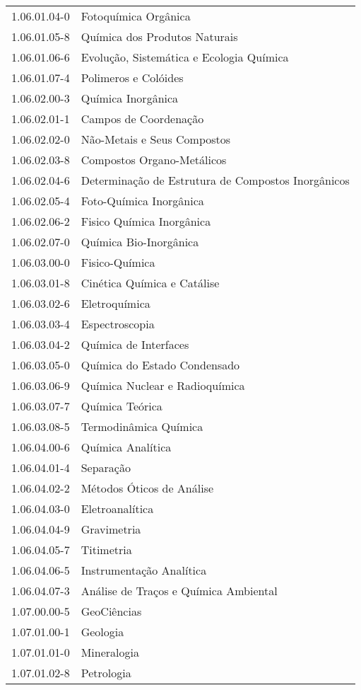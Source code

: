 \begin{longtable}[c]{p{2.15cm}p{13cm}}
1.06.01.04-0 & Fotoquímica Orgânica \\
1.06.01.05-8 & Química dos Produtos Naturais \\
1.06.01.06-6 & Evolução, Sistemática e Ecologia Química \\
1.06.01.07-4 & Polimeros e Colóides \\
1.06.02.00-3 & Química Inorgânica \\
1.06.02.01-1 & Campos de Coordenação \\
1.06.02.02-0 & Não-Metais e Seus Compostos \\
1.06.02.03-8 & Compostos Organo-Metálicos \\
1.06.02.04-6 & Determinação de Estrutura de Compostos Inorgânicos \\
1.06.02.05-4 & Foto-Química Inorgânica \\
1.06.02.06-2 & Fisico Química Inorgânica \\
1.06.02.07-0 & Química Bio-Inorgânica \\
1.06.03.00-0 & Fisico-Química \\
1.06.03.01-8 & Cinética Química e Catálise \\
1.06.03.02-6 & Eletroquímica \\
1.06.03.03-4 & Espectroscopia \\
1.06.03.04-2 & Química de Interfaces \\
1.06.03.05-0 & Química do Estado Condensado \\
1.06.03.06-9 & Química Nuclear e Radioquímica \\
1.06.03.07-7 & Química Teórica \\
1.06.03.08-5 & Termodinâmica Química \\
1.06.04.00-6 & Química Analítica \\
1.06.04.01-4 & Separação \\
1.06.04.02-2 & Métodos Óticos de Análise \\
1.06.04.03-0 & Eletroanalítica \\
1.06.04.04-9 & Gravimetria \\
1.06.04.05-7 & Titimetria \\
1.06.04.06-5 & Instrumentação Analítica \\
1.06.04.07-3 & Análise de Traços e Química Ambiental \\
1.07.00.00-5 & GeoCiências \\
1.07.01.00-1 & Geologia \\
1.07.01.01-0 & Mineralogia \\
1.07.01.02-8 & Petrologia \\

\end{longtable}
